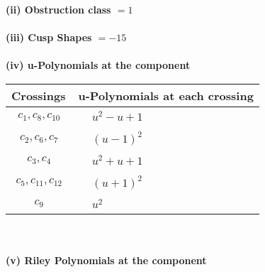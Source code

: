 \documentclass[1p]{elsarticle_modified}
\theoremstyle{definition}
\begin{document}
\flushleft \textbf{(ii) Obstruction class $= 1$}\\~\\
\flushleft \textbf{(iii) Cusp Shapes $= -15$}\\~\\
\newpage\renewcommand{\arraystretch}{1}
\flushleft \textbf{(iv) u-Polynomials at the component}\newline \\
\begin{tabular}{m{50pt}|m{274pt}}
Crossings & \hspace{64pt}u-Polynomials at each crossing \\
\hline $$\begin{aligned}c_{1},c_{8},c_{10}\end{aligned}$$&$\begin{aligned}
&u^2- u+1
\end{aligned}$\\
\hline $$\begin{aligned}c_{2},c_{6},c_{7}\end{aligned}$$&$\begin{aligned}
&(u-1)^2
\end{aligned}$\\
\hline $$\begin{aligned}c_{3},c_{4}\end{aligned}$$&$\begin{aligned}
&u^2+u+1
\end{aligned}$\\
\hline $$\begin{aligned}c_{5},c_{11},c_{12}\end{aligned}$$&$\begin{aligned}
&(u+1)^2
\end{aligned}$\\
\hline $$\begin{aligned}c_{9}\end{aligned}$$&$\begin{aligned}
&u^2
\end{aligned}$\\
\hline
\end{tabular}\\~\\
\newpage\renewcommand{\arraystretch}{1}
\flushleft \textbf{(v) Riley Polynomials at the component}\newline \\
\end{document}
